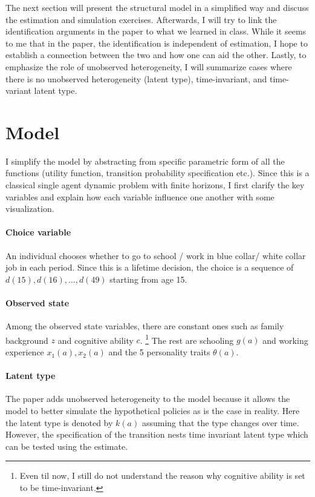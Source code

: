 \documentclass[12pt]{article}
\begin{document}
The next section will present the structural model in a simplified way and
discuss the estimation and simulation exercises. Afterwards, I will try to link
the identification arguments in the paper to what we learned in class. While it
seems to me that in the paper, the identification is independent of estimation,
I hope to establish a connection between the two and how one can aid the other.
Lastly, to emphasize the role of unobserved heterogeneity, I will summarize
cases where there is no unobserved heterogeneity (latent type), time-invariant,
and time-variant latent type.

\section{Model}
I simplify the model by abstracting from specific parametric form of all the
functions (utility function, transition probability specification etc.). Since
this is a classical single agent dynamic problem with finite horizons, I first
clarify the key variables and explain how each variable influence one another
with some visualization.
\paragraph{Choice variable} An individual chooses whether to go to school / work in blue collar/ white
collar job in each period. Since this is a lifetime decision, the choice is a
sequence of $d(15),d(16),\ldots,d(49)$ starting from age 15.
\paragraph{Observed state} Among the observed state variables, there are constant ones such as family
background $z$ and cognitive ability $c$. \footnote{Even til now, I still do
    not understand the reason why cognitive ability is set to be time-invariant.}
The rest are schooling $g(a)$ and working experience $x_1(a),x_2(a)$ and the 5
personality traits $\theta(a)$.
\paragraph{Latent type} The paper adds unobserved heterogeneity to the model because it allows the
model to better simulate the hypothetical policies as is the case in reality.
Here the latent type is denoted by $k(a)$ assuming that the type changes over
time. However, the specification of the transition nests time invariant latent
type which can be tested using the estimate.
\end{document}
